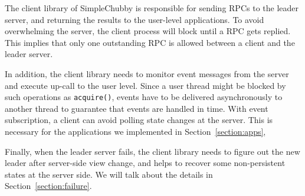 The client library of SimpleChubby is responsible for sending RPCs to the
leader server, and returning the results to the user-level applications.
To avoid overwhelming the server, the client process will block until a RPC
gets replied. This implies that only one
outstanding RPC is allowed between a client and the leader server.

In addition, the client library needs to
monitor event messages from the server and execute up-call
to the user level.
Since a user thread might be blocked by such operations
as \texttt{acquire()}, events have to be delivered asynchronously
to another thread to guarantee that events are handled in time.
With event subscription, a client can avoid polling state changes
at the server. This is necessary for the applications we implemented
in Section~\ref{section:apps},

Finally, when the leader server fails, the client library needs to figure out
the new leader after server-side view change, and helps to recover some
non-persistent states at the server side. We will talk about the details in
Section~\ref{section:failure}.




